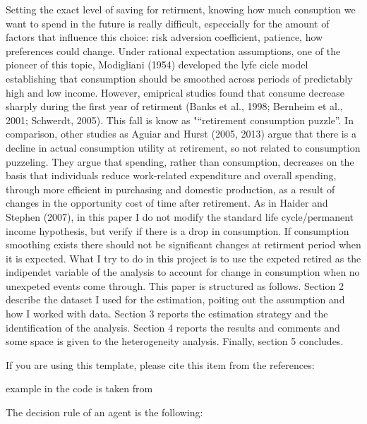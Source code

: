 \documentclass[11pt, a4paper, leqno]{article}
\begin{document}
Setting the exact level of saving for retirment, knowing how much consuption we want to spend in the future is really difficult, especcially for the amount of factors that influence this choice: risk adversion coefficient, patience, how preferences could change. Under rational expectation assumptions, one of the pioneer of this topic, Modigliani (1954) developed the lyfe cicle model establishing that consumption should be smoothed across periods of predictably high and low income. However, emiprical studies found that consume decrease sharply during the first year of retirment (Banks et al., 1998; Bernheim et al., 2001; Schwerdt, 2005). This fall is know as "“retirement consumption puzzle”. In comparison, other studies as Aguiar and Hurst (2005, 2013) argue that there is a decline in actual consumption utility at retirement, so not related to consumption puzzeling. They argue that spending, rather than consumption, decreases on the basis that individuals reduce work-related expenditure and overall spending, through more efficient in purchasing and domestic production, as a result of changes in the opportunity cost of time after retirement.
As in Haider and Stephen (2007), in this paper I do not modify the standard life cycle/permanent income hypothesis, but verify if there is a drop in consumption. If consumption smoothing exists there should not be significant changes at retirment period when it is expected. What I try to do in this project is to use the expeted retired as the indipendet variable of the analysis to account for change in consumption when no unexpeted events come through.
This paper is structured as follows. Section 2 describe the dataset I used for the estimation, poiting out the assumption and how I worked with data. Section 3 reports the estimation strategy and the identification of the analysis. Section 4 reports the results and comments and some space is given to the heterogeneity analysis. Finally, section 5 concludes.

If you are using this template, please cite this item from the references: \citet{GaudeckerEconProjectTemplates}

\citet{Schelling69} example in the code is taken from \citet{StachurskiSargent13}

The decision rule of an agent is the following:


\end{document}

